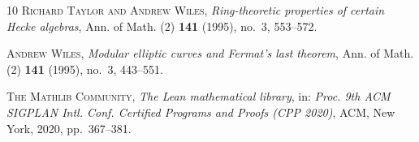 \documentclass[12pt,reqno]{amsart}
\theoremstyle{plain}
\theoremstyle{definition}
\theoremstyle{remark}
\begin{document}
\begin{thebibliography}{10}
\textsc{Richard Taylor and Andrew Wiles},
\emph{Ring-theoretic properties of certain Hecke algebras},
Ann. of Math. (2) \textbf{141} (1995), no.~3, 553--572.

\textsc{Andrew Wiles},
\emph{Modular elliptic curves and Fermat's last theorem},
Ann. of Math. (2) \textbf{141} (1995), no.~3, 443--551.

\textsc{The Mathlib Community},
\emph{The Lean mathematical library},
in: \emph{Proc. 9th ACM SIGPLAN Intl. Conf. Certified Programs and Proofs
(CPP 2020)}, ACM, New York, 2020, pp.\ 367--381.

\end{thebibliography}
\end{document}
